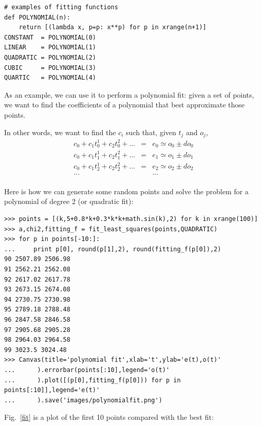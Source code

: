 \documentclass[justified,sixbynine]{tufte-book}
\def\ft{\small\tt}
\theoremstyle{plain}%
\theoremstyle{definition}
\theoremstyle{remark}
\begin{document}
\begin{fullwidth}
\begin{lstlisting}[caption={in file: {\ft nlib.py}}]
# examples of fitting functions
def POLYNOMIAL(n):
    return [(lambda x, p=p: x**p) for p in xrange(n+1)]
CONSTANT  = POLYNOMIAL(0)
LINEAR    = POLYNOMIAL(1)
QUADRATIC = POLYNOMIAL(2)
CUBIC     = POLYNOMIAL(3)
QUARTIC   = POLYNOMIAL(4)
\end{lstlisting}

As an example, we can use it to perform a polynomial fit: given a set of points, we want to find the coefficients of a polynomial that best approximate those points.

In other words, we want to find the $c_i$ such that, given $t_j$ and $o_j$,
\begin{eqnarray}
c_0  + c_1 t_0^{1} + c_2 t_0^{2} +  ... & = & e_0 \simeq o_0 \pm do_0 \\
c_0  + c_1 t_1^{1} + c_2 t_1^{2} +  ... & = & e_1 \simeq o_1 \pm do_1\\
c_0  + c_1 t_2^{1} + c_2 t_2^{2} +  ... & = & e_2 \simeq o_2 \pm do_2\\
... &  &... \\
\end{eqnarray}

Here is how we can generate some random points and solve the problem for a polynomial of degree 2 (or quadratic fit):

\begin{lstlisting}[caption={in file: {\ft nlib.py}}]
>>> points = [(k,5+0.8*k+0.3*k*k+math.sin(k),2) for k in xrange(100)]
>>> a,chi2,fitting_f = fit_least_squares(points,QUADRATIC)
>>> for p in points[-10:]:
...     print p[0], round(p[1],2), round(fitting_f(p[0]),2)
90 2507.89 2506.98
91 2562.21 2562.08
92 2617.02 2617.78
93 2673.15 2674.08
94 2730.75 2730.98
95 2789.18 2788.48
96 2847.58 2846.58
97 2905.68 2905.28
98 2964.03 2964.58
99 3023.5 3024.48
>>> Canvas(title='polynomial fit',xlab='t',ylab='e(t),o(t)'
...      ).errorbar(points[:10],legend='o(t)'
...      ).plot([(p[0],fitting_f(p[0])) for p in points[:10]],legend='e(t)'
...      ).save('images/polynomialfit.png')
\end{lstlisting}

Fig.~\ref{fit} is a plot of the first 10 points compared with the best fit:


\end{fullwidth}
\end{document}
